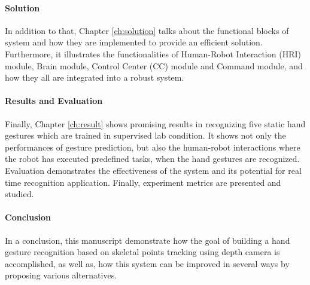 \paragraph*{Solution} In addition to that, Chapter \ref{ch:solution} talks about the functional blocks of system and how they are implemented to provide an efficient solution. Furthermore, it illustrates the functionalities of Human-Robot Interaction (HRI) module, Brain module, Control Center (CC) module and Command module, and how they all are integrated into a robust system.

\paragraph*{Results and Evaluation} Finally, Chapter \ref{ch:result} shows promising results in recognizing five static hand gestures which are trained in supervised lab condition. It shows not only the performances of gesture prediction, but also the human-robot interactions where the robot has executed predefined tasks, when the hand gestures are recognized. Evaluation demonstrates the effectiveness of the system and its potential for real time recognition application. Finally, experiment metrics are presented and studied.

\paragraph*{Conclusion} In a conclusion, this manuscript demonstrate how the goal of building a hand gesture recognition based on skeletal points tracking using depth camera is accomplished, as well as, how this system can be improved in several ways by proposing various alternatives.
